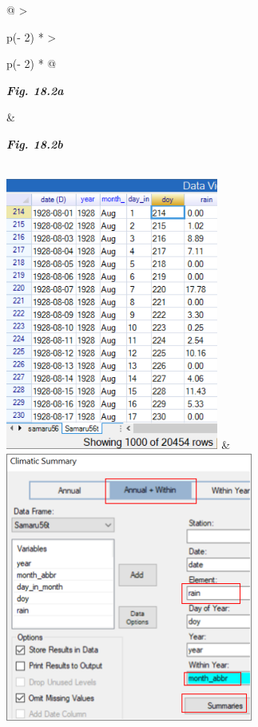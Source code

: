 \documentclass[
  letterpaper,
  DIV=11,
  numbers=noendperiod]{scrreprt}
\begin{document}
\begin{longtable}[]{@{}
  >{\raggedright\arraybackslash}p{(\columnwidth - 2\tabcolsep) * }
  >{\raggedright\arraybackslash}p{(\columnwidth - 2\tabcolsep) * }@{}}
\toprule\noalign{}
\begin{minipage}[b]{\linewidth}\raggedright
\textbf{\emph{Fig. 18.2a}}
\end{minipage} & \begin{minipage}[b]{\linewidth}\raggedright
\textbf{\emph{Fig. 18.2b}}
\end{minipage} \\
\midrule\noalign{}
\endhead
\bottomrule\noalign{}
\endlastfoot
\includegraphics[width=2.75497in,height=3.51687in]{figures/Fig18.2a.png}
&
\includegraphics[width=3.19813in,height=3.5131in]{figures/Fig18.2b.png} \\
\end{longtable}
\end{document}
